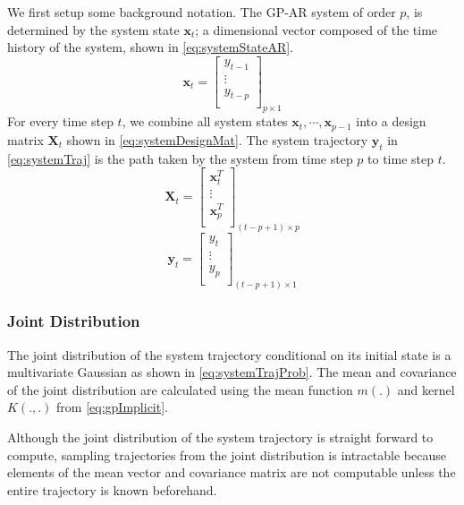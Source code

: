 We first setup some background notation. The GP-AR system of order $p$, is determined by the system state 
$\mathbf{x}_t$; a dimensional vector composed of the time history of the system, shown in \cref{eq:systemStateAR}.
%
\begin{equation}\label{eq:systemStateAR}
    \mathbf{x}_t = \begin{bmatrix}
        y_{t-1}\\ 
        \vdots\\ 
        y_{t-p}\\ 
        \end{bmatrix}_{p \times 1}
\end{equation}
%
For every time step $t$, we combine all system states $\mathbf{x}_t, \cdots, \mathbf{x}_{p-1}$ into a design matrix 
$\mathbf{X}_t$ shown in \cref{eq:systemDesignMat}. The system trajectory $\mathbf{y}_t$ in \cref{eq:systemTraj} is the 
path taken by the system from time step $p$ to time step $t$.
%
\begin{equation}\label{eq:systemDesignMat}
    \mathbf{X}_t = \begin{bmatrix}
        \mathbf{x}^{T}_{t}\\ 
        \vdots\\ 
        \mathbf{x}^{T}_{p}\\ 
        \end{bmatrix}_{(t-p+1) \times p}
\end{equation}
%
\begin{equation}\label{eq:systemTraj}
    \mathbf{y}_t = \begin{bmatrix}
        y_{t}\\ 
        \vdots\\ 
        y_{p}\\ 
        \end{bmatrix}_{(t-p+1) \times 1}
\end{equation}

\subsubsection*{Joint Distribution}

The joint distribution of the system trajectory conditional on its initial state is a multivariate Gaussian 
as shown in \cref{eq:systemTrajProb}. The mean and covariance of the joint distribution are calculated using the 
mean function $m(.)$ and kernel $K(., .)$ from \cref{eq:gpImplicit}. 

Although the joint distribution of the system trajectory is straight forward to compute, sampling trajectories from 
the joint distribution is intractable because elements of the mean vector and covariance matrix are not computable 
unless the entire trajectory is known beforehand. 

